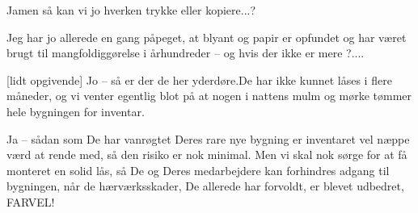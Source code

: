 \documentclass[a4paper,11pt]{article}
\begin{document}
\begin{sketch}
 Jamen så kan vi jo hverken trykke eller kopiere...?

 Jeg har jo allerede en gang påpeget, at blyant og papir er opfundet
og har været brugt til mangfoldiggørelse i århundreder -- og hvis der ikke er
mere ?.... 

[lidt opgivende] Jo -- så er der de her yderdøre.De har ikke kunnet
låses i flere måneder, og vi venter egentlig blot på at nogen i nattens mulm og
mørke tømmer hele bygningen for inventar.

 Ja -- sådan som De har vanrøgtet Deres rare nye bygning er inventaret
vel næppe værd at rende med, så den risiko er nok minimal. Men vi skal nok sørge
for at få monteret en solid lås, så De og Deres medarbejdere kan forhindres
adgang til bygningen, når de hærværksskader, De allerede har forvoldt, er blevet
udbedret, FARVEL!
\end{sketch}
\end{document}
